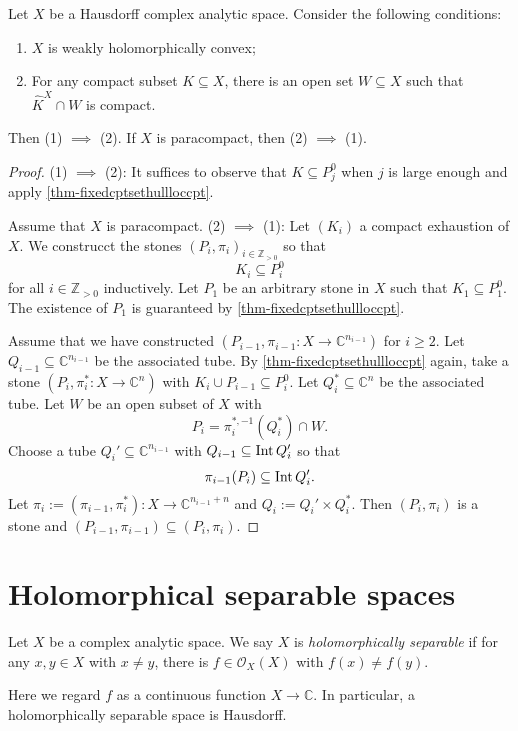 \begin{thm}\label{thm-weaklyholconvchar}
    Let $X$ be a Hausdorff complex analytic space. Consider the following conditions:
    \begin{enumerate}
        \item $X$ is weakly holomorphically convex;
        \item For any compact subset $K\subseteq X$, there is an open set $W\subseteq X$ such that $\hat{K}^X\cap W$ is compact.
    \end{enumerate}
    Then (1) $\implies$ (2). If $X$ is paracompact, then (2) $\implies$ (1).
\end{thm}
\begin{proof}
    (1) $\implies$ (2): It suffices to observe that $K\subseteq P_j^0$ when $j$ is large enough and apply \cref{thm-fixedcptsethullloccpt}.

    Assume that $X$ is paracompact.
    (2) $\implies$ (1): 
    Let $(K_i)$ a compact exhaustion of $X$. We construcct the stones $(P_i,\pi_i)_{i\in \mathbb{Z}_{>0}}$ so that 
    \[
        K_i\subseteq P_i^0
    \] 
    for all $i\in \mathbb{Z}_{>0}$
    inductively. Let $P_1$ be an arbitrary stone in $X$ such that $K_1\subseteq P_1^0$. The existence of $P_1$ is guaranteed by \cref{thm-fixedcptsethullloccpt}.

    Assume that we have constructed $(P_{i-1},\pi_{i-1}:X\rightarrow  \mathbb{C}^{n_{i-1}})$ for $i\geq 2$. Let $Q_{i-1}\subseteq \mathbb{C}^{n_{i-1}}$ be the associated tube. By   \cref{thm-fixedcptsethullloccpt} again, take a stone $(P_i,\pi_i^*:X\rightarrow \mathbb{C}^n)$ with $K_i\cup P_{i-1}\subseteq P_i^0$. Let $Q_i^*\subseteq \mathbb{C}^n$ be the associated tube. Let $W$ be an open subset of $X$ with 
    \[
        P_i=\pi_i^{*,-1}(Q_i^*)\cap W.  
    \]
    Choose a tube $Q_i'\subseteq \mathbb{C}^{n_{i-1}}$ with $Q_{i-1}\subseteq \operatorname{Int} Q_i'$ so that 
    \[
        \pi_{i-1}(P_i)\subseteq \operatorname{Int} Q_i'.
    \]
    Let $\pi_i:=(\pi_{i-1},\pi_i^*):X\rightarrow \mathbb{C}^{n_{i-1}+n}$ and $Q_i:=Q_i'\times Q_i^*$. Then $(P_i,\pi_i)$ is a stone and $(P_{i-1},\pi_{i-1})\subseteq (P_i,\pi_i)$.
\end{proof}


\section{Holomorphical separable spaces}
\begin{definition}
    Let $X$ be a complex analytic space. We say $X$ is \emph{holomorphically separable} if for any $x,y\in X$ with $x\neq y$, there is $f\in \mathcal{O}_X(X)$ with $f(x)\neq f(y)$.
\end{definition}
Here we regard $f$ as a continuous function $X\rightarrow \mathbb{C}$. In particular, a holomorphically separable space is Hausdorff.


